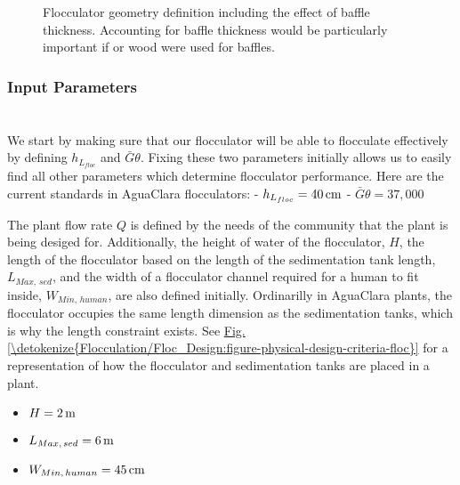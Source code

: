 \documentclass[letterpaper,10pt,english]{sphinxmanual}
\let\sphinxpxdimen\pdfpxdimen\else\newdimen\sphinxpxdimen
\begin{document}
\begin{figure}[htbp]
\centering
\capstart

\noindent\sphinxincludegraphics[width=600\sphinxpxdimen]{{Flocculator_physical_parameters}.jpg}
\caption{Flocculator geometry definition including the effect of baffle thickness. Accounting for baffle thickness would be particularly important if  or wood were used for baffles.}\label{\detokenize{Flocculation/Floc_Design:id14}}\label{\detokenize{Flocculation/Floc_Design:figure-floculator-physical-parameters}}\end{figure}


\subsubsection{Input Parameters}
\label{\detokenize{Flocculation/Floc_Design:input-parameters}}

\section{}
\label{\detokenize{Flocculation/Floc_Design:specify}}
We start by making sure that our flocculator will be able to flocculate effectively by defining \(h_{L_{floc}}\) and \(\bar G \theta\). Fixing these two parameters initially allows us to easily find all other parameters which determine flocculator performance. Here are the current standards in AguaClara flocculators:
- \(h_{L_{floc}} = 40 \, {\rm cm}\)
- \(\bar G \theta = 37,000\)

The plant flow rate \(Q\) is defined by the needs of the community that the plant is being desiged for. Additionally, the height of water  of the flocculator, \(H\), the  length of the flocculator based on the length of the sedimentation tank length, \(L_{Max, \, sed}\), and the  width of a flocculator channel required for a human to fit inside, \(W_{Min, \, human}\), are also defined initially. Ordinarilly in AguaClara plants, the flocculator occupies the same length dimension as the sedimentation tanks, which is why the length constraint exists. See \hyperref[\detokenize{Flocculation/Floc_Design:figure-physical-design-criteria-floc}]{Fig.\@ \ref{\detokenize{Flocculation/Floc_Design:figure-physical-design-criteria-floc}}} for a representation of how the flocculator and sedimentation tanks are placed in a plant.
\begin{itemize}
\item {} 
\(H = 2 \, {\rm m}\)

\item {} 
\(L_{Max, \, sed} = 6 \, {\rm m}\)

\item {} 
\(W_{Min, \, human} = 45 \, {\rm cm}\)

\end{itemize}
\end{document}
